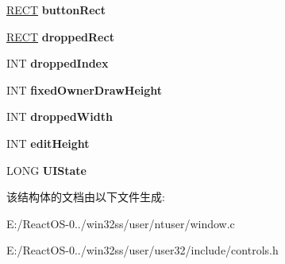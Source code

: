 \begin{DoxyCompactItemize}
\hyperlink{structtag_r_e_c_t}{R\+E\+CT} {\bfseries button\+Rect}
\item 
\mbox{\label{struct_h_e_a_d_c_o_m_b_o_a3f0b319d2ccecee5358e26995d99a4d7}} 
\hyperlink{structtag_r_e_c_t}{R\+E\+CT} {\bfseries dropped\+Rect}
\item 
\mbox{\label{struct_h_e_a_d_c_o_m_b_o_a6b650470bc418159d4d49d0ae4b7728c}} 
I\+NT {\bfseries dropped\+Index}
\item 
\mbox{\label{struct_h_e_a_d_c_o_m_b_o_a2a18eff45086c9b98988deb26de5e547}} 
I\+NT {\bfseries fixed\+Owner\+Draw\+Height}
\item 
\mbox{\label{struct_h_e_a_d_c_o_m_b_o_aba160aaeedc76a7332583bfe2e0f3d5d}} 
I\+NT {\bfseries dropped\+Width}
\item 
\mbox{\label{struct_h_e_a_d_c_o_m_b_o_ac5725434087a65b84357425c2fe9dca7}} 
I\+NT {\bfseries edit\+Height}
\item 
\mbox{\label{struct_h_e_a_d_c_o_m_b_o_a3b51eecbfca47103f3a5fcd7bf3c3b61}} 
L\+O\+NG {\bfseries U\+I\+State}
\end{DoxyCompactItemize}


该结构体的文档由以下文件生成\+:\begin{DoxyCompactItemize}
\item 
E\+:/\+React\+O\+S-\/0../win32ss/user/ntuser/window.\+c\item 
E\+:/\+React\+O\+S-\/0../win32ss/user/user32/include/controls.\+h\end{DoxyCompactItemize}
